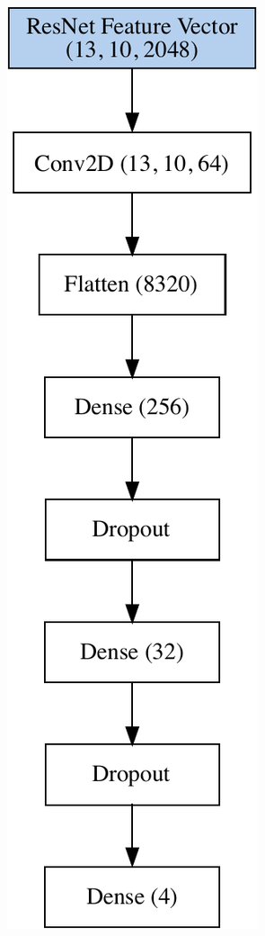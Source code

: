 \begin{figure}[h!] 
  \captionsetup{width=.9\linewidth}
  \caption{neuronale Netze, welche bei der Bild-basierten Klassifizierung zur Anwendung kommen}
  \label{image-classification-model} 
  \begin{subfigure}[b]{0.3\linewidth}
    \centering
    \includegraphics[scale=0.6]{graphics/image-classification-results/model/resnet.pdf} 

\end{subfigure}
\end{figure}
